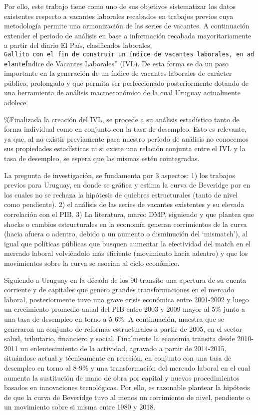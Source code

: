 \documentclass[msc,oneside,a4paper]{udelar} %
\begin{document}
  Por ello, este trabajo tiene como uno de sus objetivos sistematizar los datos existentes respecto a vacantes laborales recabados en trabajos previos cuya metodología permite una armonización de las series de vacantes. A continuación extender el periodo de análisis en base a información recabada mayoritariamente a partir del diario El País, clasificados laborales, \texttt{Gallito\textquotesingle{}\textquotesingle{}\ con\ el\ fin\ de\ construir\ un\ índice\ de\ vacantes\ laborales,\ en\ adelante}Índice de Vacantes Laborales'' (IVL). De esta forma se da un paso importante en la generación de un índice de vacantes laborales de carácter público, prolongado y que permita ser perfeccionado posteriormente dotando de una herramienta de análisis macroeconómico de la cual Uruguay actualmente adolece.
  
  \%Finalizada la creación del IVL, se procede a su análisis estadístico tanto de forma individual como en conjunto con la tasa de desempleo. Esto es relevante, ya que, al no existir previamente para nuestro período de análisis no conocemos sus propiedades estadísticas ni si existe una relación conjunta entre el IVL y la tasa de desempleo, se espera que las mismas estén cointegradas.
  
  La pregunta de investigación, se fundamenta por 3 aspectos: 1) los trabajos previos para Uruguay, en donde se gráfica y estima la curva de Beveridge por \cite{Rama1988, Urrestarazu1997, DECON1993} en los cuales no se rechaza la hipótesis de quiebres estructurales (tanto de nivel como pendiente). 2) el análisis de las series de vacantes existentes y su elevada correlación con el PIB. 3) La literatura, marco DMP, siguiendo \cite{Rodenburg2007} y \cite{Elsby2015} que plantea que shocks o cambios estructurales en la economía generan corrimientos de la curva (hacia afuera o adentro, debido a un aumento o disminución del `mismatch'), al igual que políticas públicas que busquen aumentar la efectividad del match en el mercado laboral volviéndolo más eficiente (movimiento hacia adentro) y que los movimientos sobre la curva se asocian al ciclo económico.
  
  Siguiendo a \cite{Antia2001} Uruguay en la década de los 90 transito una apertura de su cuenta corriente y de capitales que genero grandes transformaciones en el mercado laboral, posteriormente tuvo una grave crisis económica entre 2001-2002 y luego un crecimiento promedio anual del PIB entre 2003 y 2009 mayor al 5\% junto a una tasa de desempleo en torno a 5-6\%. A continuación, \cite{Bergara2017} muestra que se generaron un conjunto de reformas estructurales a partir de 2005, en el sector salud, tributario, financiero y social. Finalmente la economía transita desde 2010-2011 un enlentecimiento de la actividad, agravado a partir de 2014-2015, situándose actual y técnicamente en recesión, en conjunto con una tasa de desempleo en torno al 8-9\% y una transformación del mercado laboral en el cual aumenta la sustitución de mano de obra por capital y nuevos procedimientos basados en innovaciones tecnológicas. Por ello, es razonable plantear la hipótesis de que la curva de Beveridge tuvo al menos un corrimiento de nivel, pendiente o un movimiento sobre si misma entre 1980 y 2018.
  
\end{document}
